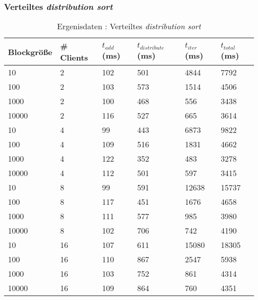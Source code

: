 \documentclass[fontsize=12pt,a4paper,headinclude=no,headings=small]{scrartcl}
\begin{document}
\subsubsection{Verteiltes \textit{distribution sort}}
\begin{table}[htp]
\begin{tabularx}{\textwidth}{ |X|X|X|X|X|X| }
\hline
Blockgröße & \# Clients & $t_{add}$ (ms) & $t_{distribute}$ (ms) & $t_{iter}$ (ms) & $t_{total}$ (ms) \\
\hline
10 & 2 & 102 & 501 & 4844 & 7792 \\
100 & 2 & 103 & 573 & 1514 & 4506 \\
1000 & 2 & 100 & 468 & 556 & 3438 \\
10000 & 2 & 116 & 527 & 665 & 3614 \\
\hline
10 & 4 & 99 & 443 & 6873 & 9822 \\ 
100 & 4 & 109 & 516 & 1831 & 4662 \\ 
1000 & 4 & 122 & 352 & 483 & 3278 \\ 
10000 & 4 & 112 & 501 & 597 & 3415 \\
\hline
10 & 8 & 99 & 591 & 12638 & 15737 \\
100 & 8 & 117 & 451 & 1676 & 4658 \\
1000 & 8 & 111 & 577 & 985 & 3980 \\
10000 & 8 & 102 & 706 & 742 & 4190 \\
\hline
10 & 16 & 107 & 611 & 15080 & 18305 \\
100 & 16 & 110 & 867 & 2547 & 5938 \\
1000 & 16 & 103 & 752 & 861 & 4314 \\
10000 & 16 & 109 & 864 & 760 & 4351 \\
\hline
\end{tabularx}
\caption{Ergenisdaten : Verteiltes \textit{distribution sort}}
\end{table}
\end{document}
